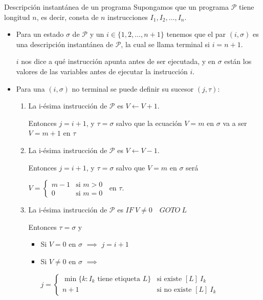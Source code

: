 \begin{definicion}{Descripción instantánea de un programa}{}
    Supongamos que un programa $\mathcal{P}$   tiene longitud $n$, es decir,
    consta de $n$ instrucciones $I_1, I_2, \dotsc, I_n$.

    \begin{itemize}
        \item Para un estado $\sigma$ de $\mathcal{P}$ y un 
            $i \in \{ 1,2,\dotsc,n+1\}$ tenemos que el par $(i, \sigma)$ es 
            una descripción instantánea de $\mathcal{P}$, la cual se llama 
            terminal si $i = n+1$.

            $i$ nos dice a qué instrucción apunta antes de ser ejecutada, y
            en $\sigma$ están los valores de las variables antes de ejecutar
            la instrucción $i$.

        \item Para una $(i, \sigma)$ no terminal se puede definir su sucesor 
        $(j, \tau)$:
        \begin{enumerate}
            \item La i-ésima instrucción de $\mathcal{P}$ es $V \gets V+1$.

            Entonces $j = i + 1$, y $\tau = \sigma$ salvo que la ecuación 
            $V=m$ en $\sigma$ va a ser $V=m+1$ en $\tau$

            \item La i-ésima instrucción de $\mathcal{P}$ es $V\gets V-1$.

                Entonces $j= i + 1$, y $\tau = \sigma$ salvo que
                $V=m$ en $\sigma$ será 

                $V = \begin{cases}
                    m - 1 & \text{si } m > 0 \\
                    0 & \text{si } m = 0
                \end{cases} ~$ en $\tau$.
                
            \item La i-ésima instrucción de $\mathcal{P}$ es 
                $IF ~ V \neq 0 \quad GOTO ~ L$

                Entonces 
                $\tau = \sigma$ y 
                \begin{itemize}
                    \item Si $V=0$ en $\sigma$
                        $\implies$
                        $j=i+1$
                    \item Si $V \neq 0$ en $\sigma$
                        $\implies$

                        $j = \begin{cases} 
                    \min{\{ k: I_k \text{ tiene etiqueta } L \}} & \text{si 
                    existe } [L] ~ I_k \\
                    n+1 & \text{si no existe } [L] ~ I_k
                \end{cases}$
                \end{itemize}
        \end{enumerate}
    \end{itemize}
\end{definicion}

